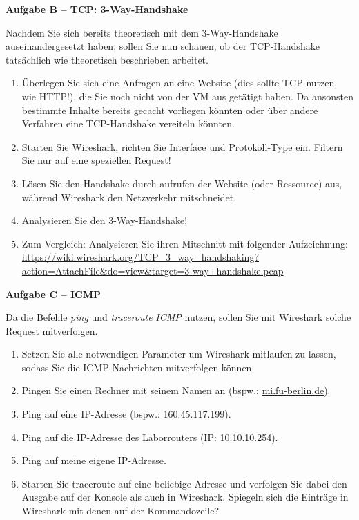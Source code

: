 \documentclass[paper=a4,fontsize=11pt]{scrartcl}%
\begin{document}
\begin{center}\Large{\textbf{Aufgabe B -- TCP: 3-Way-Handshake}}\end{center}\vskip0.2in
Nachdem Sie sich bereits theoretisch mit dem 3-Way-Handshake auseinandergesetzt haben, sollen Sie nun schauen, ob der TCP-Handshake tatsächlich wie theoretisch beschrieben arbeitet.
\begin{enumerate}
	\item Überlegen Sie sich eine Anfragen an eine Website (dies sollte TCP nutzen, wie HTTP!), die Sie noch nicht von der VM aus getätigt haben. Da ansonsten bestimmte Inhalte bereits gecacht vorliegen könnten oder über andere Verfahren eine TCP-Handshake vereiteln könnten.
	\item Starten Sie Wireshark, richten Sie Interface und Protokoll-Type ein. Filtern Sie nur auf eine speziellen Request!
	\item Lösen Sie den Handshake durch aufrufen der Website (oder Ressource) aus, während Wireshark den Netzverkehr mitschneidet.
	\item Analysieren Sie den 3-Way-Handshake!
	\item Zum Vergleich: Analysieren Sie ihren Mitschnitt mit folgender Aufzeichnung: \url{https://wiki.wireshark.org/TCP_3_way_handshaking?action=AttachFile&do=view&target=3-way+handshake.pcap}
\end{enumerate}

\begin{center}\Large{\textbf{Aufgabe C -- ICMP}}\end{center}\vskip0.2in
Da die Befehle \emph{ping} und \emph{traceroute} \emph{ICMP} nutzen, sollen Sie mit Wireshark solche Request mitverfolgen.
\begin{enumerate}
	\item Setzen Sie alle notwendigen Parameter um Wireshark mitlaufen zu lassen, sodass Sie die ICMP-Nachrichten mitverfolgen können.
	\item Pingen Sie einen Rechner mit seinem Namen an (bspw.: \url{mi.fu-berlin.de}).
	\item Ping auf eine IP-Adresse (bspw.: 160.45.117.199).
	\item Ping auf die IP-Adresse des Laborrouters (IP: 10.10.10.254).
	\item Ping auf meine eigene IP-Adresse.
	\item Starten Sie traceroute auf eine beliebige Adresse und verfolgen Sie dabei den Ausgabe auf der Konsole als auch in Wireshark. Spiegeln sich die Einträge in Wireshark mit denen auf der Kommandozeile?
\end{enumerate}
\end{document}
